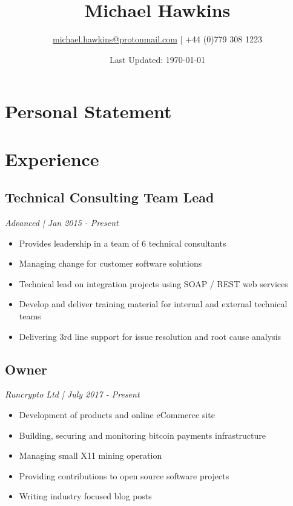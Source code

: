 \documentclass[a4paper]{article}
\title{Michael Hawkins}
\author{\href{mailto:michael.hawkins@protonmail.com}{michael.hawkins@protonmail.com} | +44 (0)779 308 1223}
\date{Last Updated: \today}
\begin{document}
%
\maketitle
%
%
\begin{minipage}[t]{0.30\textwidth}



\end{minipage}
\hfill
%
%
\begin{minipage}[t]{0.60\textwidth}
%
%
%
\section{Personal Statement}

%
%

\section{Experience}
	\subsection{Technical Consulting Team Lead}
	\textit{ Advanced | Jan 2015 - Present }
	\begin{itemize}
	\vspace{6pt}
		\item Provides leadership in a team of 6 technical consultants
		\item Managing change for customer software solutions
		\item Technical lead on integration projects using SOAP / REST web services
		\item Develop and deliver training material for internal and external technical teams
		\item Delivering 3rd line support for issue resolution and root cause analysis
	\end{itemize}

	\subsection{Owner}
	\textit{ Runcrypto Ltd | July 2017 - Present }
	\begin{itemize}
		\item Development of products and online eCommerce site
		\item Building, securing and monitoring bitcoin payments infrastructure
		\item Managing small X11 mining operation
		\item Providing contributions to open source software projects
		\item Writing industry focused blog posts
	\end{itemize}
	

\end{minipage}
\end{document}
